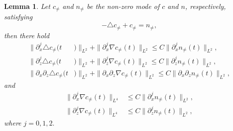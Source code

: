 \documentclass[12pt, reqno]{amsart}
\newtheorem{lemma}{Lemma}[section]
\numberwithin{equation}{section}
\begin{document}
	
	\begin{lemma}\label{lem:ellip_2}
		Let $c_{\neq}$ and $n_{\neq}$ be the non-zero mode of $c$ and $n$,
		respectively, satisfying
		$$-\triangle c_{\neq}+c_{\neq}=n_{\neq},$$
		then there hold
		\begin{align*}
			\|\partial_x^j\triangle c_{\neq}(t&)\|_{L^2}
			+\|\partial_x^j\nabla c_{\neq}(t)\|_{L^2}\leq C\|\partial_x^jn_{\neq}(t)\|_{L^2},\\
			\|\partial_z^j\triangle c_{\neq}(t&)\|_{L^2}
			+\|\partial_z^j\nabla c_{\neq}(t)\|_{L^2}\leq C\|\partial_z^jn_{\neq}(t)\|_{L^2},\\
			\|\partial_x\partial_z\triangle c_{\neq}(t&)\|_{L^2}
			+\|\partial_x\partial_z\nabla c_{\neq}(t)\|_{L^2}\leq C\|\partial_x\partial_zn_{\neq}(t)\|_{L^2},
		\end{align*}
		and
		\begin{equation*}
			\begin{aligned}
				\|\partial_x^j\nabla c_{\neq}(t)\|_{L^4}&\leq C\|\partial_x^jn_{\neq}(t)\|_{L^2},\\
				\|\partial_z^j\nabla c_{\neq}(t)\|_{L^4}&\leq C\|\partial_z^jn_{\neq}(t)\|_{L^2},
			\end{aligned}
		\end{equation*}
		where $j=0,1,2.$
	\end{lemma}
\end{document}
